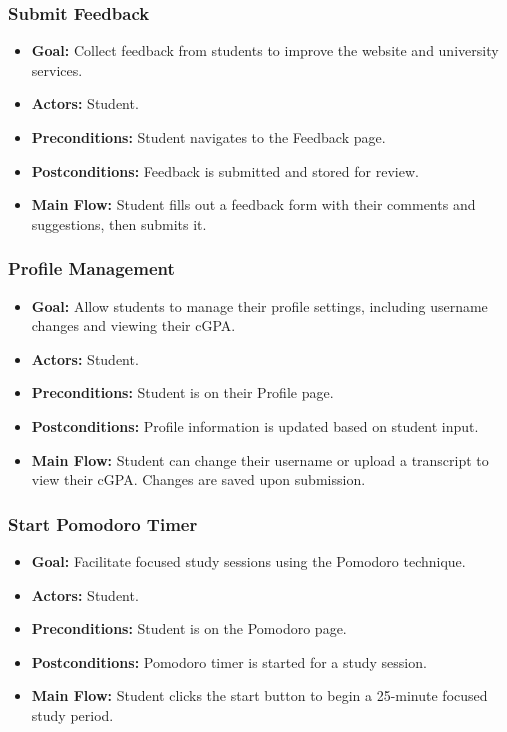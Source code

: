 \documentclass[12pt]{article}
\begin{document}
\subsubsection{Submit Feedback}
\begin{itemize}
    \item \textbf{Goal:} Collect feedback from students to improve the website and university services.
    \item \textbf{Actors:} Student.
    \item \textbf{Preconditions:} Student navigates to the Feedback page.
    \item \textbf{Postconditions:} Feedback is submitted and stored for review.
    \item \textbf{Main Flow:} Student fills out a feedback form with their comments and suggestions, then submits it. 
\end{itemize}



\subsubsection{Profile Management}
\begin{itemize}
    \item \textbf{Goal:} Allow students to manage their profile settings, including username changes and viewing their cGPA.
    \item \textbf{Actors:} Student.
    \item \textbf{Preconditions:} Student is on their Profile page.
    \item \textbf{Postconditions:} Profile information is updated based on student input.
    \item \textbf{Main Flow:} Student can change their username or upload a transcript to view their cGPA. Changes are saved upon submission.
\end{itemize}

\subsubsection{Start Pomodoro Timer}
\begin{itemize}
    \item \textbf{Goal:} Facilitate focused study sessions using the Pomodoro technique.
    \item \textbf{Actors:} Student.
    \item \textbf{Preconditions:} Student is on the Pomodoro page.
    \item \textbf{Postconditions:} Pomodoro timer is started for a study session.
    \item \textbf{Main Flow:} Student clicks the start button to begin a 25-minute focused study period.
\end{itemize}
\end{document}
